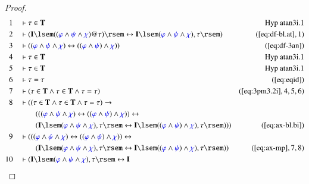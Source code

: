 \begin{proof}
\begin{align}
  1 &&  & \vdash \tau \in \mathbf{T}&\text{Hyp~atan3i.1}\notag%
  \\ 2 &&  & \vdash ( \mathbf{I} \lsem ( ( \mw{\varphi} \wedge \mw{\psi} \wedge
      \mw{\chi} ) @ \tau ) \rsem \leftrightarrow \mathbf{I}
      \lsem ( \mw{\varphi} \wedge \mw{\psi} \wedge
      \mw{\chi} ) , \tau \rsem
      )&(\mbox{\ref{eq:df-bl.at}},1)\notag
  \\ 3 &&  & \vdash ( ( \mw{\varphi} \wedge \mw{\psi} \wedge \mw{\chi} )
      \leftrightarrow ( ( \mw{\varphi} \wedge \mw{\psi} )
      \wedge \mw{\chi} ) )&(\mbox{\ref{eq:df-3an}})\notag
  \\ 4 &&  & \vdash \tau \in \mathbf{T}&\text{Hyp~atan3i.1}\notag%
  \\ 5 &&  & \vdash \tau \in \mathbf{T}&\text{Hyp~atan3i.1}\notag%
  \\ 6 &&  & \vdash \tau = \tau&(\mbox{\ref{eq:eqid}})\notag
  \\ 7 &&  & \vdash ( \tau \in \mathbf{T} \wedge \tau \in \mathbf{T} \wedge
      \tau = \tau )&(\mbox{\ref{eq:3pm3.2i}},4,5,6)\notag
  \\ 8 &&  & \vdash ( ( \tau \in \mathbf{T} \wedge \tau \in \mathbf{T} \wedge
      \tau = \tau ) \rightarrow \notag \\ & & & \qquad
       ( ( ( \mw{\varphi} \wedge
      \mw{\psi} \wedge \mw{\chi} ) \leftrightarrow ( (
      \mw{\varphi} \wedge \mw{\psi} ) \wedge \mw{\chi} ) )
      \leftrightarrow  \notag \\ & & & \qquad
      ( \mathbf{I} \lsem ( \mw{\varphi}
      \wedge \mw{\psi} \wedge \mw{\chi} ) , \tau \rsem
      \leftrightarrow \mathbf{I} \lsem ( ( \mw{\varphi}
      \wedge \mw{\psi} ) \wedge \mw{\chi} ) , \tau \rsem )
      ) )&(\mbox{\ref{eq:ax-bl.bi}})\notag
  \\ 9 &&  & \vdash ( ( ( \mw{\varphi} \wedge \mw{\psi} \wedge \mw{\chi} )
      \leftrightarrow ( ( \mw{\varphi} \wedge \mw{\psi} )
      \wedge \mw{\chi} ) ) \leftrightarrow  \notag \\ & & & \qquad
      ( \mathbf{I}
      \lsem ( \mw{\varphi} \wedge \mw{\psi} \wedge
      \mw{\chi} ) , \tau \rsem \leftrightarrow \mathbf{I}
      \lsem ( ( \mw{\varphi} \wedge \mw{\psi} ) \wedge
      \mw{\chi} ) , \tau \rsem )
      )&(\mbox{\ref{eq:ax-mp}},7,8)\notag
  \\ 10 &&  & \vdash ( \mathbf{I} \lsem ( \mw{\varphi} \wedge \mw{\psi} \wedge
      \mw{\chi} ) , \tau \rsem \leftrightarrow \mathbf{I}

\end{align}
\end{proof}
